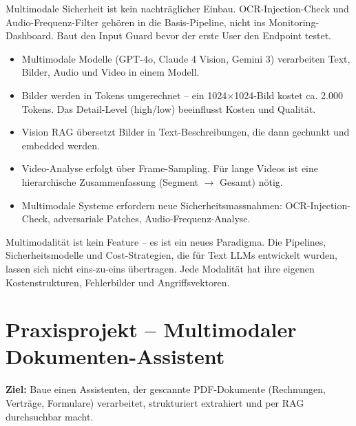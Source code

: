 \begin{praxishinweis}
Multimodale Sicherheit ist kein nachträglicher Einbau. OCR-Injection-Check und Audio-Frequenz-Filter gehören in die Basis-Pipeline, nicht ins Monitoring-Dashboard. Baut den Input Guard bevor der erste User den Endpoint testet.
\end{praxishinweis}

\begin{zusammenfassung}
\begin{itemize}[leftmargin=*]
    \item Multimodale Modelle (GPT-4o, Claude 4 Vision, Gemini 3) verarbeiten Text, Bilder, Audio und Video in einem Modell.
    \item Bilder werden in Tokens umgerechnet -- ein 1024$\times$1024-Bild kostet ca. 2.000 Tokens. Das Detail-Level (high/low) beeinflusst Kosten und Qualität.
    \item Vision RAG übersetzt Bilder in Text-Beschreibungen, die dann gechunkt und embedded werden.
    \item Video-Analyse erfolgt über Frame-Sampling. Für lange Videos ist eine hierarchische Zusammenfassung (Segment $\rightarrow$ Gesamt) nötig.
    \item Multimodale Systeme erfordern neue Sicherheitsmassnahmen: OCR-Injection-Check, adversariale Patches, Audio-Frequenz-Analyse.
\end{itemize}
\end{zusammenfassung}

\begin{merke}
Multimodalität ist kein Feature -- es ist ein neues Paradigma. Die Pipelines, Sicherheitsmodelle und Cost-Strategien, die für Text LLMs entwickelt wurden, lassen sich nicht eins-zu-eins übertragen. Jede Modalität hat ihre eigenen Kostenstrukturen, Fehlerbilder und Angriffsvektoren.
\end{merke}

\section{Praxisprojekt -- Multimodaler Dokumenten-Assistent}

\textbf{Ziel:} Baue einen Assistenten, der gescannte PDF-Dokumente (Rechnungen, Verträge, Formulare) verarbeitet, strukturiert extrahiert und per RAG durchsuchbar macht.

